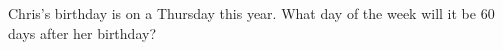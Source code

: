 Chris's birthday is on a Thursday this year. What day of the week will it be $60$ days after her birthday?

